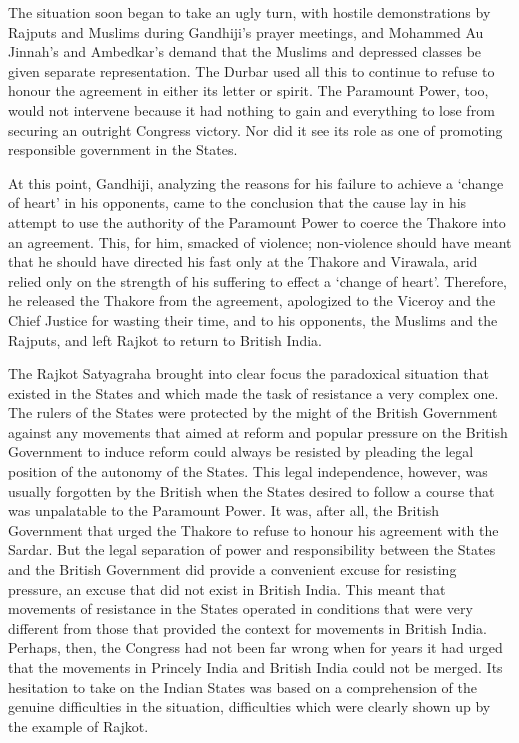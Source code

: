 The situation soon began to take an ugly turn, with hostile demonstrations by Rajputs and Muslims during Gandhiji's prayer meetings, and Mohammed Au Jinnah's and Ambedkar's demand that the Muslims and depressed classes be given separate representation. The Durbar used all this to continue to refuse to honour the agreement in either its letter or spirit. The Paramount Power, too, would not intervene because it had nothing to gain and everything to lose from securing an outright Congress victory. Nor did it see its role as one of promoting responsible government in the States. 

At this point, Gandhiji, analyzing the reasons for his failure to achieve a `change of heart' in his opponents, came to the conclusion that the cause lay in his attempt to use the authority of the Paramount Power to coerce the Thakore into an agreement. This, for him, smacked of violence; non-violence should have meant that he should have directed his fast only at the Thakore and Virawala, arid relied only on the strength of his suffering to effect a `change of heart'. Therefore, he released the Thakore from the agreement, apologized to the Viceroy and the Chief Justice for wasting their time, and to his opponents, the Muslims and the Rajputs, and left Rajkot to return to British India. 

The Rajkot Satyagraha brought into clear focus the paradoxical situation that existed in the States and which made the task of resistance a very complex one. The rulers of the States were protected by the might of the British Government against any movements that aimed at reform and popular pressure on the British Government to induce reform could always be resisted by pleading the legal position of the autonomy of the States. This legal independence, however, was usually forgotten by the British when the States desired to follow a course that was unpalatable to the Paramount Power. It was, after all, the British Government that urged the Thakore to refuse to honour his agreement with the Sardar. But the legal separation of power and responsibility between the States and the British Government did provide a convenient excuse for resisting pressure, an excuse that did not exist in British India. This meant that movements of resistance in the States operated in conditions that were very different from those that provided the context for movements in British India. Perhaps, then, the Congress had not been far wrong when for years it had urged that the movements in Princely India and British India could not be merged. Its hesitation to take on the Indian States was based on a comprehension of the genuine difficulties in the situation, difficulties which were clearly shown up by the example of Rajkot. 

